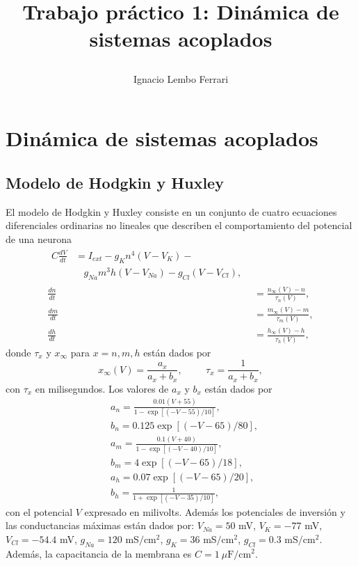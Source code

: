 \documentclass[11pt,twocolumn,twoside]{opticajnl}
\title{

\vspace{0.5cm} 

Trabajo práctico 1: Dinámica de sistemas acoplados}
\author[1]{\huge{Ignacio Lembo Ferrari}}
\affil[1]{\large{ignaciolembo@ib.edu.ar} 

\vspace{0.3cm}

\large{13 de septiembre de 2023.}

\vspace{0.5cm}
}
\begin{document}
\maketitle

\section{Dinámica de sistemas acoplados \label{sec:p1}}

\vspace{0.3cm}

\subsection{Modelo de Hodgkin y Huxley \label{sec:modelo}}

\vspace{0.3cm}

El modelo de Hodgkin y Huxley consiste en un conjunto de cuatro ecuaciones diferenciales ordinarias no lineales que describen el comportamiento del potencial de una neurona
\begin{align}
    \begin{split}
        C \frac{d V}{d t} &= I_{ext} - g_{K}n^4(V-V_{K}) - \\
                          &~~~~g_{Na}m^3h(V-V_{Na})  - g_{Cl}(V-V_{Cl}), 
        \label{ec:corriente}
    \end{split} \\
    \frac{dn}{dt} &= \frac{n_{\infty}(V) - n}{\tau_n(V)}, \\
    \frac{dm}{dt} &=\frac{m_{\infty}(V) - m}{\tau_m(V)}, \\
    \frac{dh}{dt} &= \frac{h_{\infty}(V) - h}{\tau_h(V)}, 
\end{align}
donde $\tau_x$ y $x_{\infty}$ para $x=n,m,h$ están dados por 
\begin{equation}
    x_{\infty}(V) = \frac{a_x}{a_x+b_x}, \hspace{1cm} \tau_x = \frac{1}{a_x + b_x},
\end{equation}
con $\tau_x$ en milisegundos. Los valores de $a_x$ y $b_x$ están dados por
\begin{align}
    &a_n = \frac{0.01 (V+55)}{1 - \exp[ (-V-55) / 10 ]}, \\
    &b_n = 0.125\exp[ (-V-65)/80], \\
    &a_m = \frac{0.1 (V+40)}{1 - \exp[ (-V-40) / 10 ]}, \\
    &b_m = 4 \exp[ (-V - 65)/18 ], \\
    &a_h = 0.07 \exp[ (-V - 65)/20 ], \\
    &b_h = \frac{1}{1 + \exp[ (-V-35)/10 ]},
\end{align} 
con el potencial $V$ expresado en milivolts. Además los potenciales de inversión y las conductancias máximas están dados por: $V_{Na} = 50$ mV,  $V_{K} = -77$ mV,  $V_{Cl} = -54.4$ mV, $g_{Na} = 120$ mS$/$cm$^2$, $g_{K} = 36$ mS$/$cm$^2$, $g_{Cl} = 0.3$ mS$/$cm$^2$. Además, la capacitancia de la membrana es $C = 1~\mu\text{F}/\text{cm}^2$.
\end{document}
